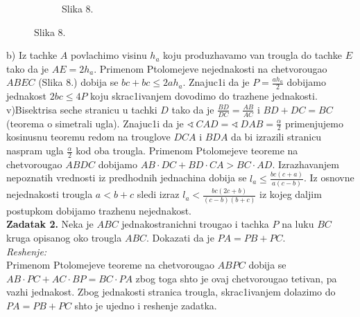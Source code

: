 \documentclass[11pt,letter]{report}
\def\ug{\mathbin{\sphericalangle\,}}
\newcommand{\D}{\displaystyle}
\begin{document}
\begin{flushleft}
\begin{figure}[h!]
\begin{subfigure}{0.48\textwidth}
\caption*{Slika 8.} 
\end{subfigure}
\end{figure}
b) Iz tachke $A$ povlachimo visinu $h_a$ koju produzhavamo van trougla do tachke $E$ tako da je $AE=2h_a$. Primenom Ptolomejeve nejednakosti na chetvorougao $ABEC$ (Slika 8.) dobija se $bc+bc\leq 2ah_a$. Znajuc1i da je $\D P=\frac{ah_a}{2}$ dobijamo jednakost $2bc\leq 4P$ koju skrac1ivanjem dovodimo do trazhene jednakosti.\\
\vspace{0.1cm}
v)Bisektrisa seche stranicu u tachki $D$ tako da je $\D\frac{BD}{DC}=\frac{AB}{AC}$ i $BD+DC=BC$ (teorema o simetrali ugla). Znajuc1i da je $\D\ug CAD=\ug DAB =\frac{\alpha}{2}$ primenjujemo kosinusnu teoremu redom na trouglove $DCA$ i $BDA$ da bi izrazili stranicu naspram ugla $\D\frac{\alpha}{2}$ kod oba trougla. Primenom Ptolomejeve teoreme na chetvorougao $ABDC$ dobijamo $\D AB\cdot DC+BD\cdot CA>BC\cdot AD$. Izrazhavanjem nepoznatih vrednosti iz predhodnih jednachina dobija se $\D l_a\leq \frac{bc(c+a)}{a(c-b)}$. Iz osnovne nejednakosti trougla $a<b+c$ sledi izraz $\D l_a<\frac{bc(2c+b)}{(c-b)(b+c)}$ iz kojeg daljim postupkom dobijamo trazhenu nejednakost.\\
\vspace{0.3cm}
\textbf{Zadatak 2.} Neka je $ABC$ jednakostranichni trougao i tachka $P$ na luku $BC$ kruga opisanog oko trougla $ABC$. Dokazati da je $PA=PB+PC$.\\
\vspace{0.05cm}
\textit{Reshenje:}\\
\vspace{0.05cm}
Primenom Ptolomejeve teoreme na chetvorougao $ABPC$ dobija se $AB\cdot PC+AC\cdot BP=BC\cdot PA$ zbog toga shto je ovaj chetvorougao tetivan, pa vazhi jednakost. Zbog jednakosti stranica trougla, skrac1ivanjem dolazimo do $PA=PB+PC$ shto je ujedno i reshenje zadatka.
\end{flushleft}
\end{document}
